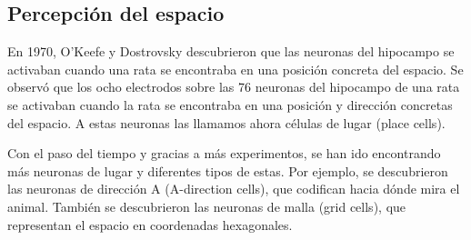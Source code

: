 \documentclass[12pt, letterpaper]{article}
\begin{document}
\subsection{Percepción del espacio}
En 1970, O'Keefe y Dostrovsky descubrieron que las neuronas del hipocampo se activaban cuando una rata se encontraba en una posición concreta del espacio. Se observó que los ocho electrodos sobre las 76 neuronas del hipocampo de una rata se activaban cuando la rata se encontraba en una posición y dirección concretas del espacio. A estas neuronas las llamamos ahora células de lugar (place cells). 

Con el paso del tiempo y gracias a más experimentos, se han ido encontrando más neuronas de lugar y diferentes tipos de estas. Por ejemplo, se descubrieron las neuronas de dirección A (A-direction cells), que codifican hacia dónde mira el animal. También se descubrieron las neuronas de malla (grid cells), que representan el espacio en coordenadas hexagonales.
\end{document}
